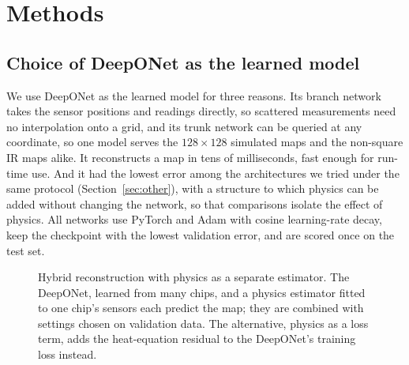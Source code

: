 \documentclass[journal]{IEEEtran}
\begin{document}
\section{Methods}\label{sec:methods}

\subsection{Choice of DeepONet as the learned model}
We use DeepONet as the learned model for three reasons.
Its branch network takes the sensor positions and readings directly, so scattered measurements need no interpolation onto a grid, and its trunk network can be queried at any coordinate, so one model serves the $128\times128$ simulated maps and the non-square IR maps alike.
It reconstructs a map in tens of milliseconds, fast enough for run-time use.
And it had the lowest error among the architectures we tried under the same protocol (Section~\ref{sec:other}), with a structure to which physics can be added without changing the network, so that comparisons isolate the effect of physics.
All networks use PyTorch and Adam \cite{kingma2015adam} with cosine learning-rate decay, keep the checkpoint with the lowest validation error, and are scored once on the test set.

\begin{figure}[t]
\centering
{}
\caption{Hybrid reconstruction with physics as a separate estimator. The DeepONet, learned from many chips, and a physics estimator fitted to one chip's sensors each predict the map; they are combined with settings chosen on validation data. The alternative, physics as a loss term, adds the heat-equation residual to the DeepONet's training loss instead.}
\label{fig:overview}
\end{figure}
\end{document}
